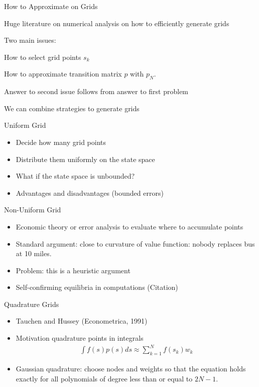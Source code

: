 \documentclass[aspectratio=169,11pt]{beamer}
\begin{document}
\begin{frame}{How to Approximate on Grids}
\begin{outline}
\item Huge literature on numerical analysis on how to efficiently generate grids
\item Two main issues:
\begin{outline}
\item How to select grid points $s_k$
\item How to approximate transition matrix $p$ with $p_N$.
\end{outline}
\item Answer to second issue follows from answer to first problem
\item We can combine strategies to generate grids
\end{outline}
\end{frame}

\begin{frame}{Uniform Grid}
\begin{itemize}
\item Decide how many grid points
\item Distribute them uniformly on the state space
\item What if the state space is unbounded?
\item Advantages and disadvantages (bounded errors)
\end{itemize}
\end{frame}


\begin{frame}{Non-Uniform Grid}
\begin{itemize}
\item Economic theory or error analysis to evaluate where to accumulate points
\item Standard argument: close to curvature of value function: nobody replaces bus at 10 miles.
\item Problem: this is a heuristic argument
\item Self-confirming equilibria in computations (Citation)
\end{itemize}
\end{frame}

\begin{frame}{Quadrature Grids}
\begin{itemize}
\item Tauchen and Hussey (Econometrica, 1991)
\item Motivation quadrature points in integrals
\begin{eqnarray*}
\int f(s) p(s) d s \approx \sum_{k=1}^N f(s_k) w_k
\end{eqnarray*}
\item Gaussian quadrature: choose nodes and weights so that the equation holds exactly for all polynomials of degree less than or equal to $2N -1$.
\end{itemize}
\end{frame}
\end{document}
